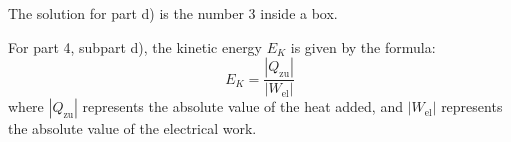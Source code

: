 The solution for part d) is the number 3 inside a box.

For part 4, subpart d), the kinetic energy \( E_K \) is given by the formula:
\[
E_K = \frac{|Q_{\text{zu}}|}{|W_{\text{el}}|}
\]
where \( |Q_{\text{zu}}| \) represents the absolute value of the heat added, and \( |W_{\text{el}}| \) represents the absolute value of the electrical work.